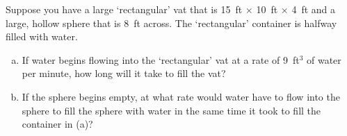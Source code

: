 \documentclass[11pt,letterpaper]{article}
\begin{document}

 Suppose you have a large `rectangular' vat that is 15~ft $\times$ 10~ft $\times$ 4~ft and a large, hollow sphere that is 8~ft across. The `rectangular' container is halfway filled with water. 
	\begin{enumerate}[(a)]
	\item If water begins flowing into the `rectangular' vat at a rate of 9~ft$^3$ of water per minute, how long will it take to fill the vat?
	\item If the sphere begins empty, at what rate would water have to flow into the sphere to fill the sphere with water in the same time it took to fill the container in (a)?
	\end{enumerate} \pspace
\end{document}
